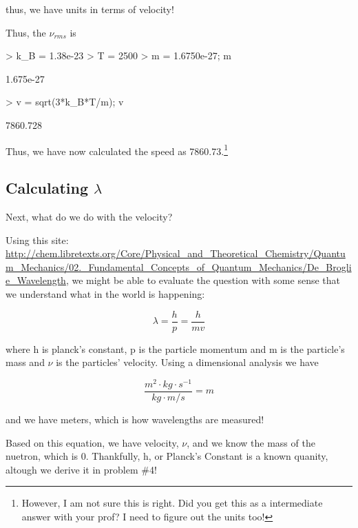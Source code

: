 \documentclass{article}
\begin{document}
\noindent thus, we have units in terms of velocity! 

Thus, the $\nu_{rms}$ is
\begin{Schunk}
\begin{Sinput}
> k_B = 1.38e-23
> T = 2500
> m = 1.6750e-27; m
\end{Sinput}
\begin{Soutput}
[1] 1.675e-27
\end{Soutput}
\begin{Sinput}
> v = sqrt(3*k_B*T/m); v
\end{Sinput}
\begin{Soutput}
[1] 7860.728
\end{Soutput}
\end{Schunk}

Thus, we have now calculated the speed as 7860.73.\footnote{However, I am not sure this is right. Did you get this as a intermediate answer with your prof? I need to figure out the units too!}

\subsection{Calculating $\lambda$}

Next, what do we do with the velocity?  

Using this site: \url{http://chem.libretexts.org/Core/Physical_and_Theoretical_Chemistry/Quantum_Mechanics/02._Fundamental_Concepts_of_Quantum_Mechanics/De_Broglie_Wavelength}, we might be able to evaluate the question with some sense that we understand what in the world is happening:

\begin{equation}
\lambda = \frac{h}{p} = \frac{h}{ m v}
\end{equation}

\noindent where h is planck's constant, p is the particle momentum and m is the particle's mass and $\nu$ is the particles' velocity. Using a dimensional analysis we have

\begin{equation}
\frac{m^2 \cdot kg \cdot s^{-1}}{kg \cdot m /s} = m  
\end{equation}

\noindent and we have meters, which is how wavelengths are measured!

Based on this equation, we have velocity, $\nu$, and we know the mass of the nuetron, which is 0. Thankfully, h, or Planck's Constant is a known quanity, altough we derive it in problem \#4!
\end{document}
